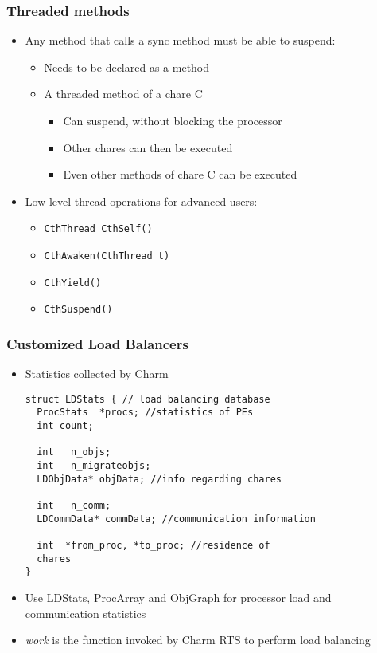 \begin{frame}[fragile]
\frametitle{Threaded methods}
 \begin{itemize}
  \item Any method that calls a sync method must be able to suspend:
  \begin{itemize}
   \item Needs to be declared as a  method
   \item A threaded method of a chare C
   \begin{itemize}
    \item Can suspend, without blocking the processor
    \item Other chares can then be executed
    \item Even other methods of chare C can be executed
   \end{itemize}
  \end{itemize}  
 \item Low level thread operations for advanced users:
 \begin{itemize}
   \item \texttt{CthThread CthSelf()}
   \item \texttt{CthAwaken(CthThread t)}
   \item \texttt{CthYield()}
   \item \texttt{CthSuspend()}
 \end{itemize}
\end{itemize}
\end{frame}


\begin{frame}[fragile]
\frametitle{Customized Load Balancers}
\begin{itemize}
\item Statistics collected by Charm
\begin{lstlisting}[basicstyle=\tiny]
struct LDStats { // load balancing database
  ProcStats  *procs; //statistics of PEs
  int count;

  int   n_objs;
  int   n_migrateobjs;
  LDObjData* objData; //info regarding chares

  int   n_comm;
  LDCommData* commData; //communication information

  int  *from_proc, *to_proc; //residence of
  chares
}
\end{lstlisting}
\item Use LDStats, ProcArray and ObjGraph for processor load and communication
statistics
\item \emph{work} is the function invoked by Charm RTS to perform load balancing
\end{itemize}
\end{frame}

